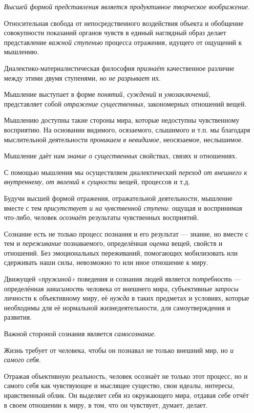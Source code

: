 \documentclass[a4paper,14pt,russian]{extreport}
\begin{document}
\emph{Высшей формой представления является продуктивное творческое воображение}.

Относительная свобода от непосредственного воздействия объекта и обобщение совокупности показаний органов чувств в единый наглядный образ делает представление \emph{важной ступенью} процесса отражения, идущего от ощущений к мышлению.

Диалектико-материалистическая философия \emph{признаёт} качественное различие между этими двумя ступенями, \emph{но не разрывает} их.

Мышление выступает в форме \emph{понятий, суждений} и \emph{умозаключений}, представляет собой \emph{отражение существенных}, закономерных отношений вещей.

Мышлению доступны такие стороны мира, которые недоступны чувственному восприятию. На основании видимого, осязаемого, слышимого и т.п. мы благодаря мыслительной деятельности \emph{проникаем в невидимое}, неосязаемое, неслышимое.

Мышление даёт нам \emph{знание о существенных} свойствах, связях и отношениях.

С помощью мышления мы осуществляем диалектический \emph{переход от внешнего к внутреннему}, \emph{от явлений к сущности} вещей, процессов и т.д.

Будучи высшей формой отражения, отражательной деятельности, мышление вместе с тем \emph{присутствует и на чувственной ступени}: ощущая и воспринимая что-либо, человек \emph{осознаёт} результаты чувственных восприятий.

Сознание есть не только процесс познания и его результат --- знание, но вместе с тем и \emph{переживание} познаваемого, определённая \emph{оценка} вещей, свойств и отношений. Без эмоциональных переживаний, помогающих мобилизовать или сдерживать наши силы, невозможно то или иное отношение к миру.

Движущей «\emph{пружиной»} поведения и сознания людей является \emph{потребность} --- определённая \emph{зависимость} человека от внешнего мира, субъективные \emph{запросы} личности к объективному миру, её \emph{нужда} в таких предметах и условиях, которые необходимы для её нормальной жизнедеятельности, для самоутверждения и развития.

Важной стороной сознания является \emph{самосознание}.

Жизнь требует от человека, чтобы он познавал не только внешний мир, но \emph{и самого себя}.

Отражая объективную реальность, человек осознаёт не только этот процесс, но и самого себя как чувствующее и мыслящее существо, свои идеалы, интересы, нравственный облик. Он выделяет себя из окружающего мира, отдавая себе отчёт в своем отношении к миру, в том, что он чувствует, думает, делает.
\end{document}
